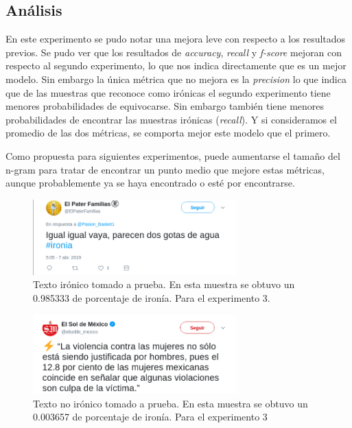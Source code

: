 	

		 \subsection{Análisis}
		 \par En este experimento se pudo notar una mejora leve con respecto a los resultados previos. Se pudo ver que los resultados de \textit{accuracy}, \textit{recall} y \textit{f-score} mejoran con respecto al segundo experimento, lo que nos indica directamente que es un mejor modelo. Sin embargo la única métrica que no mejora es la \textit{precision} lo que indica que de las muestras que reconoce como irónicas el segundo experimento tiene menores probabilidades de equivocarse. Sin embargo también tiene menores probabilidades de encontrar las muestras irónicas (\textit{recall}). Y si consideramos el promedio de las dos métricas, se comporta mejor este modelo que el primero.
		 
		 \par Como propuesta para siguientes experimentos, puede aumentarse el tamaño del n-gram para tratar de encontrar un punto medio que mejore estas métricas, aunque probablemente ya se haya encontrado o esté por encontrarse.
	
	\begin{figure}
	       \centering
	       \includegraphics[width=0.7\textwidth]{imagenes/ironia1.png}
	       \caption{Texto irónico tomado a prueba. En esta muestra se obtuvo un 0.985333 de porcentaje de ironía. Para el experimento 3.} %
	       \label{fig:ironyTest1}
	   \end{figure}
	   
	   \begin{figure}
	       \centering
	       \includegraphics[width=0.7\textwidth]{imagenes/ironia2.png}
	       \caption{Texto no irónico tomado a prueba. En esta muestra se obtuvo un 0.003657 de porcentaje de ironía. Para el experimento 3} %
	       \label{fig:ironyTest2}
	   \end{figure}
	   
